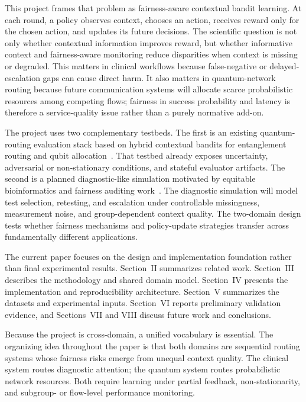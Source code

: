 \documentclass[conference]{IEEEtran}
\begin{document}
This project frames that problem as fairness-aware contextual bandit learning.
At each round, a policy observes context, chooses an action, receives reward
only for the chosen action, and updates its future decisions. The scientific
question is not only whether contextual information improves reward, but
whether informative context and fairness-aware monitoring reduce disparities
when context is missing or degraded. This matters in clinical workflows because
false-negative or delayed-escalation gaps can cause direct harm. It also
matters in quantum-network routing because future communication systems will
allocate scarce probabilistic resources among competing flows; fairness in
success probability and latency is therefore a service-quality issue rather
than a purely normative add-on.

The project uses two complementary testbeds. The first is an existing
quantum-routing evaluation stack based on hybrid contextual bandits for
entanglement routing and qubit allocation~\cite{garcia2026threat_aware_quantum_routing}.
That testbed already exposes uncertainty, adversarial or non-stationary
conditions, and stateful evaluator artifacts. The second is a planned
diagnostic-like simulation motivated by equitable bioinformatics and fairness
auditing work~\cite{garcia2025equitable_bioinformatics}. The diagnostic
simulation will model test selection, retesting, and escalation under
controllable missingness, measurement noise, and group-dependent context
quality. The two-domain design tests whether fairness mechanisms and
policy-update strategies transfer across fundamentally different applications.

The current paper focuses on the design and implementation foundation rather
than final experimental results. Section~II summarizes related work.
Section~III describes the methodology and shared domain model.
Section~IV presents the implementation and reproducibility architecture.
Section~V summarizes the datasets and experimental inputs.
Section~VI reports preliminary validation evidence, and Sections~VII and VIII
discuss future work and conclusions.

Because the project is cross-domain, a unified vocabulary is essential. The
organizing idea throughout the paper is that both domains are sequential
routing systems whose fairness risks emerge from unequal context quality. The
clinical system routes diagnostic attention; the quantum system routes
probabilistic network resources. Both require learning under partial feedback,
non-stationarity, and subgroup- or flow-level performance monitoring.
\end{document}
